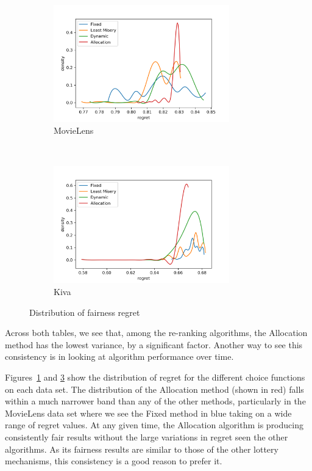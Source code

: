 \begin{figure}[t!]
    \centering
    \begin{subfigure}[t]{0.5\textwidth}
        \centering
        \includegraphics[width=3.0in]{imgs/dynfair/ML_regret_variance_sep20.png}
        \caption{MovieLens}
        \label{fig:local-regret-ML}
    \end{subfigure}%
    ~ 
    \begin{subfigure}[t]{0.5\textwidth}
        \centering
        \includegraphics[width=3.0in]{imgs/dynfair/kiva_regret_variance_sep20.png}
        \caption{Kiva}
        \label{fig:local-regret-Kiva}
    \end{subfigure}
    \caption{Distribution of fairness regret}
\end{figure}


Across both tables, we see that, among the re-ranking algorithms, the Allocation method has the lowest variance, by a significant factor. Another way to see this consistency is in looking at algorithm performance over time.


Figures~\ref{fig:local-regret-ML} and \ref{fig:local-regret-Kiva} show the distribution of regret for the different choice functions on each data set. The distribution of the Allocation method (shown in red) falls within a much narrower band than any of the other methods, particularly in the MovieLens data set where we see the Fixed method in blue taking on a wide range of regret values. At any given time, the Allocation algorithm is producing consistently fair results without the large variations in regret seen the other algorithms. As its fairness results are similar to those of the other lottery mechanisms, this consistency is a good reason to prefer it.


